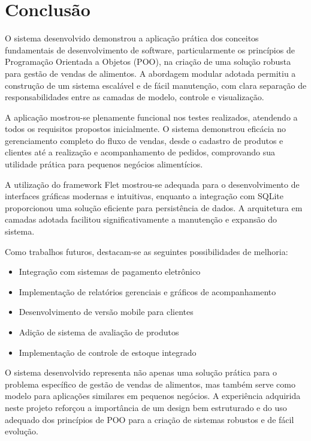 \documentclass[conference]{IEEEtran}
\begin{document}
\section{Conclusão}

O sistema desenvolvido demonstrou a aplicação prática dos conceitos fundamentais de desenvolvimento de software, particularmente os princípios de Programação Orientada a Objetos (POO), na criação de uma solução robusta para gestão de vendas de alimentos. A abordagem modular adotada permitiu a construção de um sistema escalável e de fácil manutenção, com clara separação de responsabilidades entre as camadas de modelo, controle e visualização.

A aplicação mostrou-se plenamente funcional nos testes realizados, atendendo a todos os requisitos propostos inicialmente. O sistema demonstrou eficácia no gerenciamento completo do fluxo de vendas, desde o cadastro de produtos e clientes até a realização e acompanhamento de pedidos, comprovando sua utilidade prática para pequenos negócios alimentícios.

A utilização do framework Flet mostrou-se adequada para o desenvolvimento de interfaces gráficas modernas e intuitivas, enquanto a integração com SQLite proporcionou uma solução eficiente para persistência de dados. A arquitetura em camadas adotada facilitou significativamente a manutenção e expansão do sistema.

Como trabalhos futuros, destacam-se as seguintes possibilidades de melhoria:
\begin{itemize}
    \item Integração com sistemas de pagamento eletrônico
    \item Implementação de relatórios gerenciais e gráficos de acompanhamento
    \item Desenvolvimento de versão mobile para clientes
    \item Adição de sistema de avaliação de produtos
    \item Implementação de controle de estoque integrado
\end{itemize}

O sistema desenvolvido representa não apenas uma solução prática para o problema específico de gestão de vendas de alimentos, mas também serve como modelo para aplicações similares em pequenos negócios. A experiência adquirida neste projeto reforçou a importância de um design bem estruturado e do uso adequado dos princípios de POO para a criação de sistemas robustos e de fácil evolução.
\end{document}
